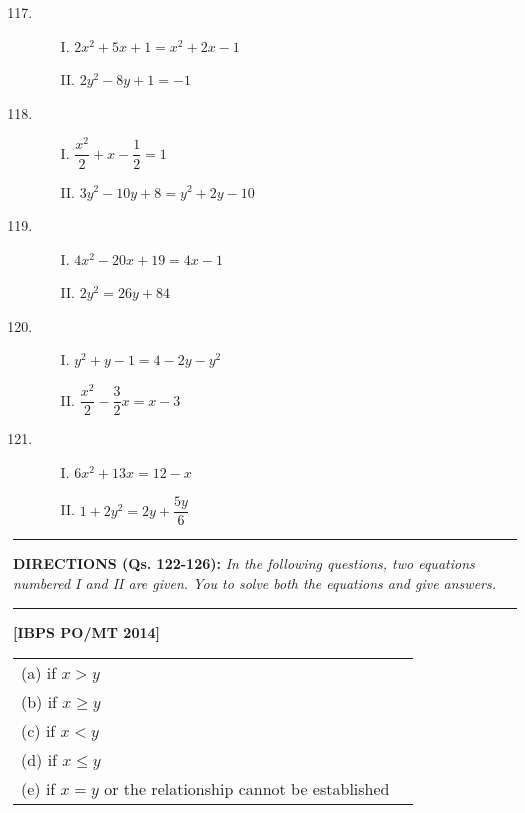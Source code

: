 \begin{multicols}{2}
\begin{enumerate}[leftmargin=*]
\setcounter{enumi}{116}
\item 

\begin{itemize}
\item[I.] $2x^2 + 5x + 1 = x^2 + 2x - 1$
\item[II.] $2y^2 - 8y + 1 = -1$
\end{itemize}

\item
\begin{itemize}
\item[I.] $\dfrac{x^2}{2} + x - \dfrac{1}{2} = 1$
\item[II.] $3y^2 - 10y + 8 = y^2 + 2y - 10$
\end{itemize}

\item
\begin{itemize}
\item[I.] $4x^2 - 20x + 19 = 4x - 1$
\item[II.] $2y^2 = 26y + 84$
\end{itemize}

\item
\begin{itemize}
\item[I.] $y^2 + y - 1 = 4 - 2y - y^2$
\item[II.] $\dfrac{x^2}{2} - \dfrac{3}{2}x = x - 3$
\end{itemize}

\item
\begin{itemize}
\item[I.] $6x^2 + 13x = 12 - x$
\item[II.] $1 + 2y^2 = 2y + \dfrac{5y}{6}$
\end{itemize}
\end{enumerate}

\noindent
\rule{\columnwidth}{1pt}

\noindent
{\sf\bfseries DIRECTIONS (Qs. 122-126):} {\it In the following questions, two equations numbered I and II are given. You to solve both the equations and give answers.}

\noindent
\rule{\columnwidth}{1pt}

\hfill{\bf [IBPS PO/MT 2014]}

\begin{tabular}{l@{\qquad\quad}l}
(a) if $x > y$\\
(b) if $x \geq y$\\
(c) if $x < y$\\
(d) if $x \leq y$\\
(e) if $x = y$ or the relationship cannot be established
\end{tabular}


\end{multicols}
